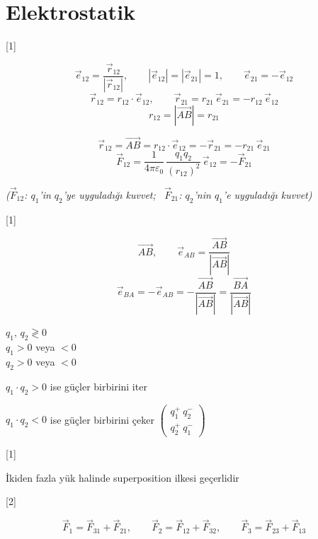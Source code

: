 \documentclass[11pt,a4paper]{article}
\begin{document}

\section{Elektrostatik}

[1]

\[ \vec e_{12} = \frac{\vec r_{12}}{|\vec r_{12}|}, \qquad |\vec e_{12}| = |\vec e_{21}| = 1, \qquad \vec e_{21} = -\vec e_{12} \]
\[ \vec r_{12} = r_{12}\cdot\vec e_{12}, \qquad \vec r_{21} = r_{21}\,\vec e_{21} = -r_{12}\,\vec e_{12} \]
\[ r_{12} = |\overrightarrow{AB}| = r_{21} \]


\[ \vec r_{12} = \overrightarrow{AB} = r_{12}\cdot\vec e_{12} = -\vec r_{21} = -r_{21}\,\vec e_{21} \]
\[ \vec F_{12} = \frac{1}{4\pi\varepsilon_0}\,\frac{q_1 q_2}{(r_{12})^2}\,\vec e_{12} = -\vec F_{21} \]

\noindent\textit{($\vec F_{12}$: $q_1$'in $q_2$'ye uyguladığı kuvvet; \ $\vec F_{21}$: $q_2$'nin $q_1$'e uyguladığı kuvvet)}

[1]

\[ \overrightarrow{AB}, \qquad \vec e_{AB} = \frac{\overrightarrow{AB}}{|\overrightarrow{AB}|} \]
\[ \vec e_{BA} = -\vec e_{AB} = -\frac{\overrightarrow{AB}}{|\overrightarrow{AB}|} = \frac{\overrightarrow{BA}}{|\overrightarrow{AB}|} \]

\noindent $q_1,\,q_2 \gtrless 0$\\
$q_1 > 0$ veya $< 0$\\
$q_2 > 0$ veya $< 0$

\noindent $q_1\cdot q_2 > 0$ ise güçler birbirini iter

\noindent $q_1\cdot q_2 < 0$ ise güçler birbirini çeker $\left(\begin{matrix} q_1^{+}\ q_2^{-}\\ q_2^{+}\ q_1^{-} \end{matrix}\right)$

[1]

\noindent İkiden fazla yük halinde superposition ilkesi geçerlidir

[2]

\[ \vec F_1 = \vec F_{31} + \vec F_{21}, \qquad \vec F_2 = \vec F_{12} + \vec F_{32}, \qquad \vec F_3 = \vec F_{23} + \vec F_{13} \]
\end{document}

